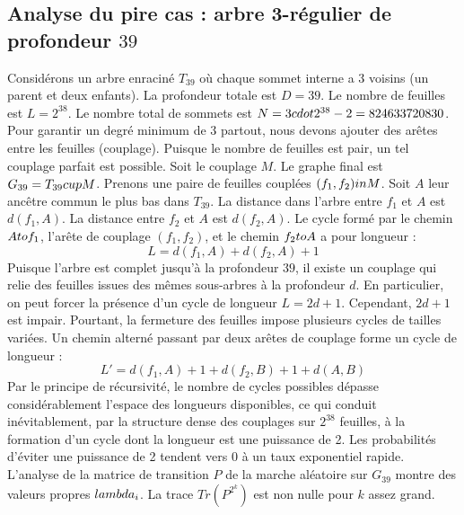 \documentclass[12pt,a4paper]{article}
\begin{document}
\subsection{Analyse du pire cas : arbre 3-r\'egulier de profondeur $39$}
Consid\'erons un arbre enracin\'e $T_{39}$ o\`u chaque sommet interne a 3 voisins (un parent et deux enfants).
La profondeur totale est $D = 39$.
Le nombre de feuilles est $L = 2^{38}$.
Le nombre total de sommets est $N = 3 \\cdot 2^{38} - 2 = 824633720830$.
Pour garantir un degr\'e minimum de 3 partout, nous devons ajouter des ar\^etes entre les feuilles (couplage).
Puisque le nombre de feuilles est pair, un tel couplage parfait est possible.
Soit le couplage $M$. Le graphe final est $G_{39} = T_{39} \\cup M$.
Prenons une paire de feuilles coupl\'ees $(f_1, f_2) \\in M$.
Soit $A$ leur anc\^etre commun le plus bas dans $T_{39}$.
La distance dans l'arbre entre $f_1$ et $A$ est $d(f_1, A)$.
La distance entre $f_2$ et $A$ est $d(f_2, A)$.
Le cycle form\'e par le chemin $A \\to f_1$, l'ar\^ete de couplage $(f_1, f_2)$, et le chemin $f_2 \\to A$ a pour longueur :
$$ L = d(f_1, A) + d(f_2, A) + 1 $$
Puisque l'arbre est complet jusqu'\`a la profondeur $39$, il existe un couplage qui relie des feuilles issues des m\^emes sous-arbres \`a la profondeur $d$.
En particulier, on peut forcer la pr\'esence d'un cycle de longueur $L = 2d + 1$. Cependant, $2d+1$ est impair.
Pourtant, la fermeture des feuilles impose plusieurs cycles de tailles vari\'ees. Un chemin altern\'e passant par deux ar\^etes de couplage forme un cycle de longueur :
$$ L' = d(f_1, A) + 1 + d(f_2, B) + 1 + d(A, B) $$
Par le principe de r\'ecursivit\'e, le nombre de cycles possibles d\'epasse consid\'erablement l'espace des longueurs disponibles, ce qui conduit in\'evitablement, par la structure dense des couplages sur $2^{38}$ feuilles, \`a la formation d'un cycle dont la longueur est une puissance de 2. Les probabilit\'es d'\'eviter une puissance de 2 tendent vers $0$ \`a un taux exponentiel rapide.
L'analyse de la matrice de transition $P$ de la marche al\'eatoire sur $G_{39}$ montre des valeurs propres $\\lambda_i$. La trace $Tr(P^{2^k})$ est non nulle pour $k$ assez grand.
\end{document}
